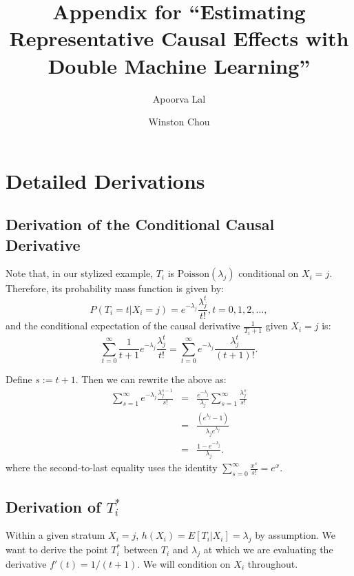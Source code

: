 \documentclass[11pt]{article}
\title{Appendix for ``Estimating Representative Causal Effects with Double Machine Learning''}
\author{Apoorva Lal \and Winston Chou}
\date{}
\begin{document}
\maketitle

\appendix

\section{Detailed Derivations}

\subsection{Derivation of the Conditional Causal Derivative}
\label{sec:poisson-derivation}
Note that, in our stylized example, $T_i$ is $\text{Poisson}(\lambda_j)$ conditional on $X_i = j$.  Therefore, its probability mass function is given by:
\begin{equation}
    P(T_i = t | X_i = j) = e^{-\lambda_j} \frac{\lambda_j^t}{t!}, t = 0, 1, 2, \ldots,
\end{equation}
and the conditional expectation of the causal derivative $\frac{1}{T_i + 1}$ given $X_i = j$ is:
\begin{equation}
    \sum_{t = 0}^\infty \frac{1}{t + 1} e^{-\lambda_j} \frac{\lambda_j^t}{t!} = \sum_{t = 0}^\infty e^{-\lambda_j} \frac{\lambda_j^t}{(t + 1)!}.
\end{equation}

Define $s := t + 1$.  Then we can rewrite the above as:
\begin{eqnarray}
\sum_{s = 1}^\infty e^{-\lambda_j} \frac{\lambda_j^{s - 1}}{s!} &=& \frac{e^{-\lambda_j}}{\lambda_j} \sum_{s = 1}^\infty \frac{\lambda_j^s}{s!} \\
&=& \frac{(e^{\lambda_j} - 1)}{\lambda_j e^{\lambda_j}} \\
&=& \frac{1 - e^{-\lambda_j}}{\lambda_j}.
\end{eqnarray}
where the second-to-last equality uses the identity $\sum_{s = 0}^\infty \frac{x^s}{s!} = e^x$.


\subsection{Derivation of $T_i^*$}

\label{sec:poisson-tstar-derivation}

Within a given stratum $X_i = j$, $h(X_i) = E[T_i | X_i] = \lambda_j$ by assumption.  We want to derive the point $T_i^*$ between $T_i$ and $\lambda_j$ at which we are evaluating the derivative $f'(t) = 1 / (t + 1)$.  We will condition on $X_i$ throughout.
\end{document}
